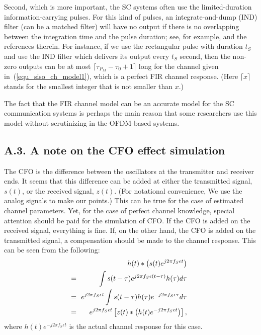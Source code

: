 \documentclass[11pt,draftnofoot,onecolumn]{IEEEtran}
\begin{document}
Second, which is more important, the SC systems often use the
limited-duration information-carrying pulses. For this kind of
pulses, an integrate-and-dump (IND) filter (can be a matched filter)
will have no output if there is no overlapping between the
integration time and the pulse duration; see, for example,
\cite{LiLiMiller2001} and the references therein. For instance, if
we use the rectangular pulse with duration $t_S$ and use the IND
filter which delivers its output every $t_S$ second, then the
non-zero outputs can be at most $\lceil \tau_{P_M} - \tau_0 +
1\rceil$ long for the channel given in~(\ref{equ_siso_ch_model1}),
which is a perfect FIR channel response. (Here $\lceil x \rceil$
stands for the smallest integer that is not smaller than $x$.)

The fact that the FIR channel model can be an accurate model for the
SC communication systems is perhaps the main reason that some
researchers use this model without scrutinizing in the OFDM-based
systems.


\subsection*{A.3. A note on the CFO effect simulation}
\label{app_siso_F}

The CFO is the difference between the oscillators at the transmitter
and receiver ends. It seems that this difference can be added at
either the transmitted signal, $s(t)$, or the received signal,
$z(t)$. (For notational convenience, We use the analog signals to
make our points.) This can be true for the case of estimated channel
parameters. Yet, for the case of perfect channel knowledge, special
attention should be paid for the simulation of CFO. If the CFO is
added on the received signal, everything is fine. If, on the other
hand, the CFO is added on the transmitted signal, a compensation
should be made to the channel response. This can be seen from the
following:
\begin{eqnarray}
& & \bs \bs \bs \bs \bs
   h(t) * \left ( s(t) e^{j 2\pi f_S \epsilon
t} \right ) \nonumber \\
      & \bs = \bs &
   \int s(t-\tau) e^{j 2\pi f_S \epsilon (t - \tau)} h(\tau) d \tau \nonumber \\
      & \bs = \bs &
   e^{j 2\pi f_S \epsilon t } \int s(t-\tau) h(\tau) e^{- j 2\pi f_S \epsilon \tau} d \tau \nonumber \\
      & \bs = \bs &
   e^{j 2\pi f_S \epsilon t } \left [ z(t) *
      \left ( h(t) e^{- j 2\pi f_S \epsilon t} \right ) \right ],
\end{eqnarray}
where $h(t) e^{- j 2\pi f_S \epsilon t}$ is the actual channel
response for this case.
\end{document}
